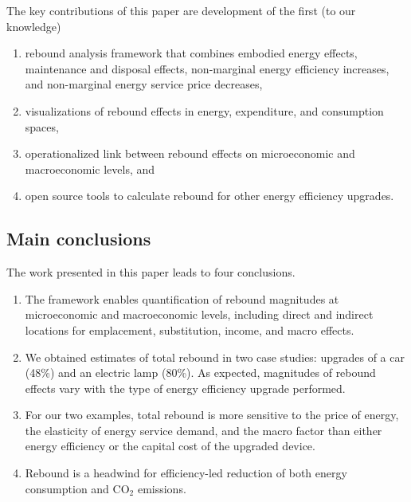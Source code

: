 \documentclass[12pt]{article}    %
\begin{document}
The key contributions of this paper are 
development of the first (to our knowledge)
%
\begin{enumerate}[label={(\roman*)}]
	
  \item rebound analysis framework that combines 
        embodied energy effects, 
        maintenance and disposal effects, 
        non-marginal energy efficiency increases, and 
        non-marginal energy service price decreases, 

  \item visualizations of rebound effects
        in energy, expenditure, and consumption spaces,
        
  \item operationalized link between 
        rebound effects on microeconomic and macroeconomic levels, and 
        
  \item open source tools to calculate rebound 
        for other energy efficiency upgrades.
  
\end{enumerate}


\subsection*{Main conclusions}
\label{sec:conclusions}

The work presented in this paper leads to four conclusions.
%
\begin{enumerate}[label={(\roman*)}]

  \item The framework enables
        quantification of rebound magnitudes at microeconomic and macroeconomic levels, including 
        direct and indirect locations 
        for emplacement, substitution, income, and macro effects.
        
  \item We obtained estimates of total rebound in two case studies: 
        upgrades of a car (48\%) and an electric lamp (80\%).
        As expected, magnitudes of rebound effects
        vary with the type of energy efficiency upgrade performed.
        
  \item For our two examples, total rebound is   
        more sensitive to
        the price of energy,
        the elasticity of energy service demand, and
        the macro factor
        than either
        energy efficiency or
        the capital cost of the upgraded device.
        
  \item Rebound is a headwind for efficiency-led reduction of both energy consumption 
        and CO$_2$ emissions.

\end{enumerate}
\end{document}
